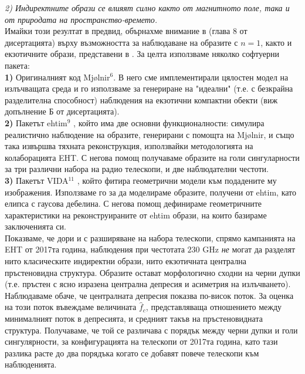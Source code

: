 \documentclass[12pt]{article}
\numberwithin{equation}{section}
\numberwithin{figure}{section}
\begin{document}
	\emph{2) Индиректните образи се влияят силно както от магнитното поле, така и от природата на пространство-времето.}\\
	
	Имайки този резултат в предвид, обърнахме внимание в \cite{Deliyski2024} (глава 8 от дисертацията) върху възможността за наблюдаване на образите с $n = 1$, както и екзотичните образи, представени в \cite{Deliyski2022}\cite{Gyulchev2020}\cite{Gyulchev2021}. За целта използваме няколко софтуерни пакета:\\
	
	\textbf{1)} Оригиналният код Mjølnir$^6$. В него сме имплементирали цялостен модел на излъчващата среда и го използваме за генериране на "идеални" (т.е. с безкрайна разделителна способност) наблюдения на екзотични компактни обекти (виж допълнение Б от дисертацията).\\
	
	\textbf{2)} Пакетът ehtim$^{9}$ \cite{EHTIM}, който има две основни функционалности: симулира реалистично наблюдение на образите, генерирани с помощта на Mjølnir, и също така извършва тяхната реконструкция, използвайки методологията на колаборацията EHT. С негова помощ получаваме образите на голи сингуларности за три различни набора на радио телескопи, и две наблюдателни честоти.\\
	
	\textbf{3)} Пакетът VIDA$^{11}$ \cite{VIDA}, който фитира геометрични модели към подадените му изображения. Използваме го за да моделираме образите, получени от ehtim, като елипса с гаусова дебелина. С негова помощ дефинираме геометричните характеристики на реконструираните от ehtim образи, на които базираме заключенията си.\\
	
	Показваме, че дори и с разширяване на набора телескопи, спрямо кампанията на EHT от 2017та година, наблюдения при честотата $230$ GHz \emph{не} могат да разделят нито класическите индиректни образи, нито екзотичната централна пръстеновидна структура. Образите остават морфологично сходни на черни дупки (т.е. пръстен с ясно изразена централна депресия и асиметрия на излъчването). Наблюдаваме обаче, че централната депресия показва по-висок поток. За оценка на този поток въвеждаме величината $\hat{f}_c$, представляваща отношението между минималният поток в депресията, и средният такъв на пръстеновидната структура. Получаваме, че той се различава с порядък между черни дупки и голи сингулярности, за конфигурацията на телескопи от 2017та година, като тази разлика расте до два порядъка когато се добавят повече телескопи към наблюденията.\\
	
\end{document}
